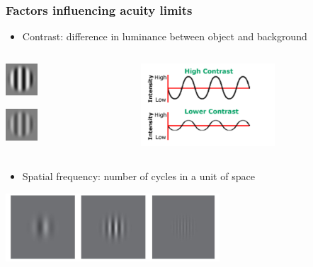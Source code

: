 \documentclass[]{beamer}
\begin{document}
\begin{frame}
\frametitle{Factors influencing acuity limits}
\begin{overlayarea}{110mm}{80mm}
\begin{itemize}
 \item Contrast: difference in luminance between object and background
\end{itemize}
\begin{columns}[T]
 \begin{column}{15mm}
\includegraphics[width=12mm]{figs/l3/high_contrast.jpg}

\includegraphics[width=12mm]{figs/l3/medium_contrast.jpg}
\end{column}

 \begin{column}{50mm}
\includegraphics[width=50mm]{figs/l3/sine_wave_high_low.png}
 \end{column}
\end{columns}

\begin{itemize}
 \item Spatial frequency: number of cycles in a unit of space
\end{itemize}

\begin{center}
\includegraphics[width=80mm]{figs/l3/gabors_sf.png}
\end{center}
\end{overlayarea}
\end{frame}
\end{document}
